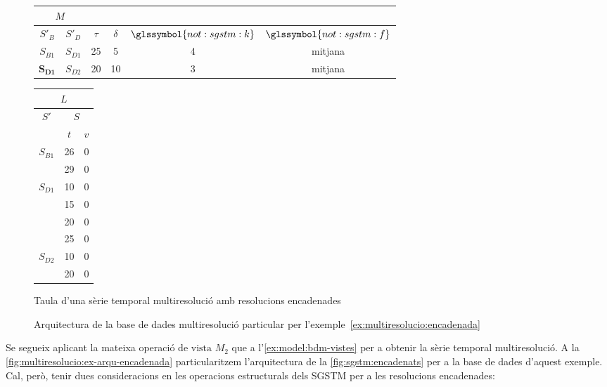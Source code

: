 \begin{example} 
  \begin{figure}[tp]
    \centering
    \begin{tabular}{|c|c|c|c|c|c|}
      \multicolumn{2}{c}{$M$} \\ \hline
      $S'_B$  & $S'_D$ & $\tau$ & $\delta$ & $\glssymbol{not:sgstm:k}$ & $\glssymbol{not:sgstm:f}$ \\ \hline
      $S_{B1}$ & $S_{D1}$ & 25 & 5  & 4 & mitjana  \\
      $\mathbf{S_{D1}}$ & $S_{D2}$ & 20 & 10 & 3 & mitjana  \\ \hline
    \end{tabular}\qquad
    \begin{tabular}{|c|c|c|}
      \multicolumn{3}{c}{$L$} \\ \hline
      \multirow{2}{*}{$S'$}  &  \multicolumn{2}{c|}{$S$} \\ \cline{2-3}
      & $t$      & $v$  \\ \hline
      \multirow{2}{*}{$S_{B1}$} 
      & 26 & 0 \\ 
      & 29 & 0 \\ \hline
      \multirow{4}{*}{$S_{D1}$} 
      & 10 & 0 \\ 
      & 15 & 0 \\ 
      & 20 & 0 \\ 
      & 25 & 0 \\ \hline
      \multirow{2}{*}{$S_{D2}$} 
      & 10 & 0 \\ 
      & 20 & 0 \\ \hline
    \end{tabular}
    \caption{Taula d'una sèrie temporal multiresolució amb resolucions encadenades}
    \label{fig:multiresolucio:exencadenat}
  \end{figure}




  \begin{figure}[tp]
    \centering
    
    \caption{Arquitectura de la base de dades multiresolució
      particular per l'exemple~\ref{ex:multiresolucio:encadenada}}
    \label{fig:multiresolucio:ex-arqu-encadenada}
  \end{figure}



  Se segueix aplicant la mateixa operació de $\text{vista } M_2$ que a
  l'\autoref{ex:model:bdm-vistes} per a obtenir la sèrie temporal
  multiresolució. A la \autoref{fig:multiresolucio:ex-arqu-encadenada}
  particularitzem l'arquitectura de la \autoref{fig:sgstm:encadenats}
  per a la base de dades d'aquest exemple. Cal, però, tenir dues
  consideracions en les operacions estructurals dels \gls{SGSTM} per a
  les resolucions encadenades: 


\end{example}
